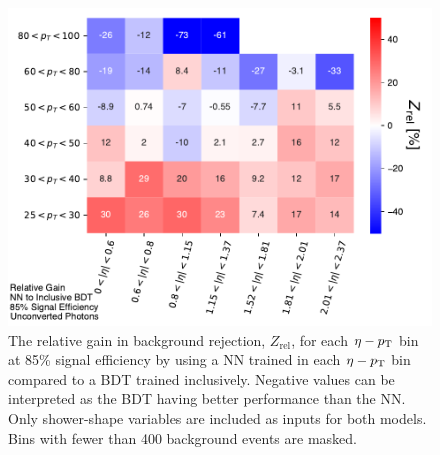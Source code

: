\begin{figure}
    \centering
    \includegraphics[width=.85\textwidth]{chapters/chapter4_photonID/images/NN_v_BDTinclusive_normed.pdf}
    \caption[The relative gain in background rejection by using a \gls{NN} trained bin-wise compared to a \gls{BDT} trained inclusively]
    {The relative gain in background rejection, $Z_{\text{rel}}$, for each $\eta-p_{\text{T}}$ bin at 85\% signal efficiency by using a \gls{NN} trained in each $\eta-p_{\text{T}}$ bin compared to a \gls{BDT} trained inclusively. Negative values can be interpreted as the \gls{BDT} having better performance than the \gls{NN}. Only shower-shape variables are included as inputs for both models. Bins with fewer than 400 background events are masked.}
    \label{fig:nn-v-bdt-unconverted}
\end{figure}



